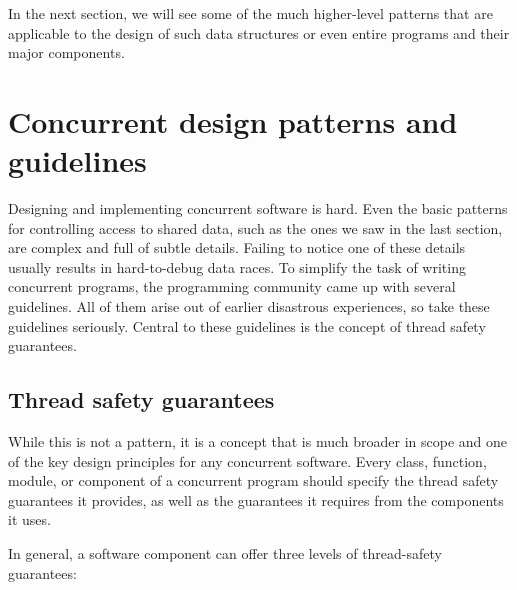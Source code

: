 In the next section, we will see some of the much higher-level patterns that are applicable to the design of such data structures or even entire programs and their major components.

\section{Concurrent design patterns and guidelines}

Designing and implementing concurrent software is hard. Even the basic patterns for controlling access to shared data, such as the ones we saw in the last section, are complex and full of subtle details. Failing to notice one of these details usually results in hard-to-debug data races. To simplify the task of writing concurrent programs, the programming community came up with several guidelines. All of them arise out of earlier disastrous experiences, so take these guidelines seriously. Central to these guidelines is the concept of thread safety guarantees.

\subsection{Thread safety guarantees}

While this is not a pattern, it is a concept that is much broader in scope and one of the key design principles for any concurrent software. Every class, function, module, or component of a concurrent program should specify the thread safety guarantees it provides, as well as the guarantees it requires from the components it uses.

In general, a software component can offer three levels of thread-safety guarantees:

